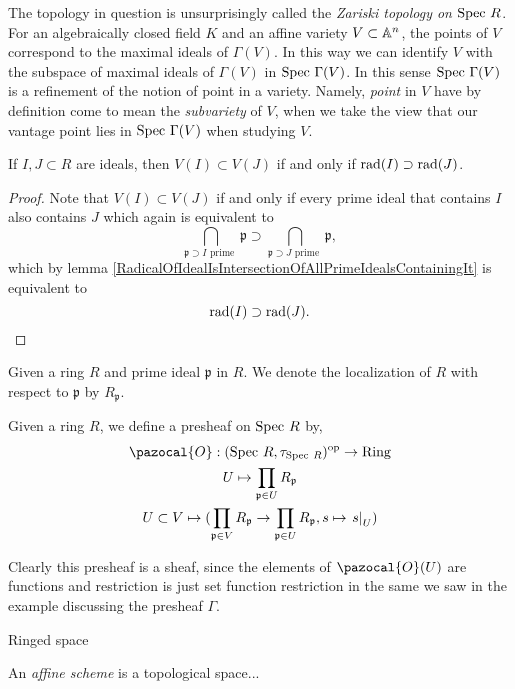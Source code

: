 \begin{remark}
    The topology in question is unsurprisingly called the \emph{Zariski topology on $\mathrm{Spec} \ R$}. For an algebraically closed field $K$ and an affine variety $V\subset \mathbb{A}^n$, the points of $V$ correspond to the maximal ideals of $\Gamma(V)$. In this way we can identify $V$ with the subspace of maximal ideals of $\Gamma(V)$ in $\mathrm{Spec} \ \Gamma(V)$. In this sense $\mathrm{Spec} \ \Gamma(V)$ is a refinement of the notion of point in a variety. Namely, \emph{point} in $V$ have by definition come to mean the \emph{subvariety} of $V$, when we take the view that our vantage point lies in $\mathrm{Spec}\ \Gamma(V)$ when studying $V$.
\end{remark}
\begin{lemma}
    If $I,J\subset R$ are ideals, then $V(I)\subset V(J)$ if and only if $\mathrm{rad}(I)\supset \mathrm{rad}(J)$.
\end{lemma}
\begin{proof}
    Note that $V(I)\subset V(J)$ if and only if every prime ideal that contains $I$ also contains $J$ which again is equivalent to 
    $$
        \bigcap_{\mathfrak{p}\supset I \text{ prime }} \mathfrak{p} \supset \bigcap_{\mathfrak{p}\supset J \text{ prime }} \mathfrak{p}, 
    $$
    which by lemma \ref{RadicalOfIdealIsIntersectionOfAllPrimeIdealsContainingIt} is equivalent to 
    $$
        \mathrm{rad}(I)\supset \mathrm{rad}(J).
    $$
\end{proof}
Given a ring $R$ and prime ideal $\mathfrak{p}$ in $R$. We denote the localization of $R$ with respect to $\mathfrak{p}$ by $R_\mathfrak{p}$.
\begin{definition}
    Given a ring $R$, we define a presheaf on $\mathrm{Spec} \ R$ by, 
    \begin{gather*}
        \pazocal{O}:(\Spec\ R, \tau_{\Spec\ R})\op\rightarrow \mathrm{Ring}\\
        U \mapsto \prod_{\mathfrak{p}\in U} R_\mathfrak{p}\\
        U\subset V \mapsto (\prod_{\mathfrak{p}\in V} R_\mathfrak{p}\rightarrow \prod_{\mathfrak{p}\in U} R_\mathfrak{p}, s\mapsto \left. s\right|_U) 
    \end{gather*}
\end{definition}
\begin{remark}
    Clearly this presheaf is a sheaf, since the elements of $\pazocal{O}(U)$ are functions and restriction is just set function restriction in the same we saw in the example discussing the presheaf $\Gamma$. 
\end{remark}
\begin{lemma}
    

\end{lemma}
\begin{definition}
    {\Large Ringed space}
\end{definition}
\begin{definition}
    An \emph{affine scheme} is a topological space...
\end{definition}

